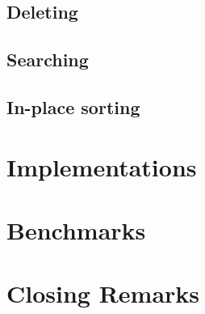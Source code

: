 \documentclass{article}
\begin{document}
	\subsection{Deleting}
	
	\subsection{Searching}
	
	\subsection{In-place sorting}
	
	\section{Implementations}
	
	\section{Benchmarks}
	
	\section{Closing Remarks}
\end{document}
